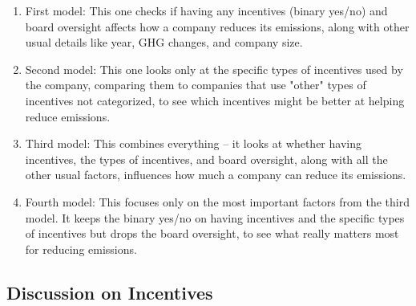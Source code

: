 \begin{enumerate}
    \item First model: This one checks if having any incentives (binary yes/no) and board oversight affects how a company reduces its emissions, along with other usual details like year, GHG changes, and company size.
    \item Second model: This one looks only at the specific types of incentives used by the company, comparing them to companies that use "other" types of incentives not categorized, to see which incentives might be better at helping reduce emissions.
    \item Third model: This combines everything – it looks at whether having incentives, the types of incentives, and board oversight, along with all the other usual factors, influences how much a company can reduce its emissions.
    \item Fourth model: This focuses only on the most important factors from the third model. It keeps the binary yes/no on having incentives and the specific types of incentives but drops the board oversight, to see what really matters most for reducing emissions.
\end{enumerate}




\subsection{Discussion on Incentives}

